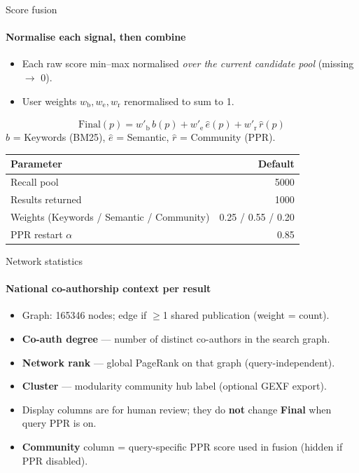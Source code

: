 \documentclass{beamer}
\begin{document}
\begin{frame}{Score fusion}
    \framesubtitle{Normalise each signal, then combine}
    \begin{itemize}
        \item Each raw score min--max normalised \emph{over the current candidate pool} (missing $\rightarrow$ 0).
        \item User weights $w_{\mathrm{b}}, w_{\mathrm{e}}, w_{\mathrm{r}}$ renormalised to sum to 1.
    \end{itemize}
    \[
        \mathrm{Final}(p) = w'_{\mathrm{b}}\,\widehat{b}(p) + w'_{\mathrm{e}}\,\widehat{e}(p) + w'_{\mathrm{r}}\,\widehat{r}(p)
    \]
    \small
    $\widehat{b}$ = Keywords (BM25), $\widehat{e}$ = Semantic, $\widehat{r}$ = Community (PPR).
    \vspace{0.3cm}

    \begin{table}
        \centering
        \footnotesize
        \begin{tabular}{lr}
            \toprule
            \textbf{Parameter} & \textbf{Default} \\
            \midrule
            Recall pool & \num{5000} \\
            Results returned & \num{1000} \\
            Weights (Keywords / Semantic / Community) & 0.25 / 0.55 / 0.20 \\
            PPR restart $\alpha$ & 0.85 \\
            \bottomrule
        \end{tabular}
    \end{table}
\end{frame}

\begin{frame}{Network statistics}
    \framesubtitle{National co-authorship context per result}
    \begin{itemize}
        \item Graph: \num{165346} nodes; edge if $\geq$1 shared publication (weight = count).
        \item \textbf{Co-auth degree} --- number of distinct co-authors in the search graph.
        \item \textbf{Network rank} --- global PageRank on that graph (query-independent).
        \item \textbf{Cluster} --- modularity community hub label (optional GEXF export).
        \item Display columns are for human review; they do \textbf{not} change \textbf{Final} when query PPR is on.
        \item \textbf{Community} column = query-specific PPR score used in fusion (hidden if PPR disabled).
    \end{itemize}
\end{frame}
\end{document}
